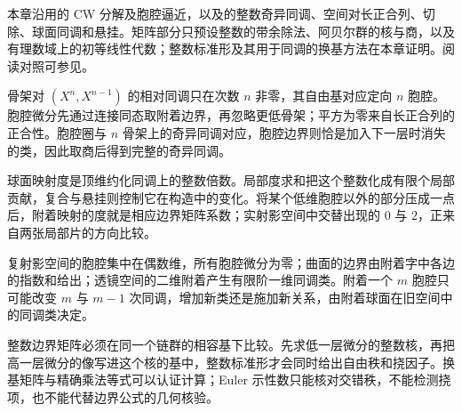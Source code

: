 \ProseParagraphBreak

本章沿用的 CW 分解及胞腔逼近，以及的整数奇异同调、空间对长正合列、切除、球面同调和悬挂。矩阵部分只预设整数的带余除法、阿贝尔群的核与商，以及有理数域上的初等线性代数；整数标准形及其用于同调的换基方法在本章证明。阅读对照可参见\cite[第2.2节，Degree 与 Cellular Homology]{Hatcher2002}。






\begin{chaptersummary}
	骨架对 \((X^n,X^{n-1})\) 的相对同调只在次数 \(n\) 非零，其自由基对应定向 \(n\) 胞腔。胞腔微分先通过连接同态取附着边界，再忽略更低骨架；平方为零来自长正合列的正合性。胞腔圈与 \(n\) 骨架上的奇异同调对应，胞腔边界则恰是加入下一层时消失的类，因此取商后得到完整的奇异同调。

	\ProseParagraphBreak

	球面映射度是顶维约化同调上的整数倍数。局部度求和把这个整数化成有限个局部贡献，复合与悬挂则控制它在构造中的变化。将某个低维胞腔以外的部分压成一点后，附着映射的度就是相应边界矩阵系数；实射影空间中交替出现的 \(0\) 与 \(2\)，正来自两张局部片的方向比较。

	\ProseParagraphBreak

	复射影空间的胞腔集中在偶数维，所有胞腔微分为零；曲面的边界由附着字中各边的指数和给出；透镜空间的二维附着产生有限阶一维同调类。附着一个 \(m\) 胞腔只可能改变 \(m\) 与 \(m-1\) 次同调，增加新类还是施加新关系，由附着球面在旧空间中的同调类决定。

	\ProseParagraphBreak

	整数边界矩阵必须在同一个链群的相容基下比较。先求低一层微分的整数核，再把高一层微分的像写进这个核的基中，整数标准形才会同时给出自由秩和挠因子。换基矩阵与精确乘法等式可以认证计算；Euler 示性数只能核对交错秩，不能检测挠项，也不能代替边界公式的几何核验。
\end{chaptersummary}

\BookExercises


